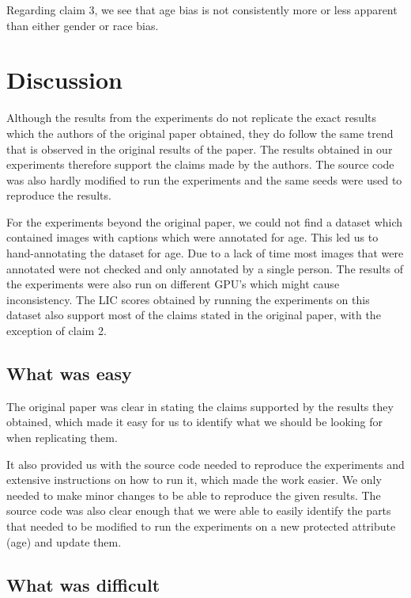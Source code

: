Regarding claim 3, we see that age bias is not consistently more or less apparent than either gender or race bias. 

\section{Discussion}

Although the results from the experiments do not replicate the exact results which the authors of the original paper \cite{Hirota2022} obtained, they do follow the same trend that is observed in the original results of the paper. The results obtained in our experiments therefore support the claims made by the authors. The source code was also hardly modified to run the experiments and the same seeds were used to reproduce the results.

For the experiments beyond the original paper, we could not find a dataset which contained images with captions which were annotated for age. This led us to hand-annotating the dataset for age. Due to a lack of time most images that were annotated were not checked and only annotated by a single person. The results of the experiments were also run on different GPU's which might cause inconsistency. The LIC scores obtained by running the experiments on this dataset also support most of the claims stated in the original paper, with the exception of claim 2.

\subsection{What was easy}

The original paper \cite{Hirota2022} was clear in stating the claims supported by the results they obtained, which made it easy for us to identify what we should be looking for when replicating them.

It also provided us with the source code needed to reproduce the experiments and extensive instructions on how to run it, which made the work easier. We only needed to make minor changes to be able to reproduce the given results. The source code was also clear enough that we were able to easily identify the parts that needed to be modified to run the experiments on a new protected attribute (age) and update them. 

\subsection{What was difficult}

